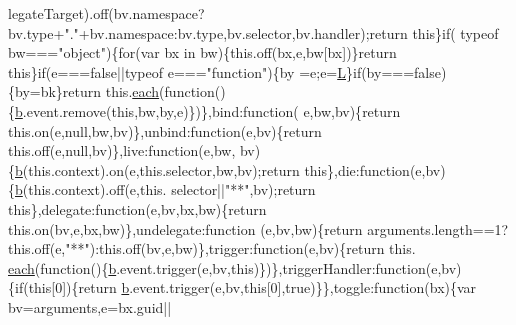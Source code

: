 \begin{DoxyCode}
      legateTarget).off(bv.namespace?bv.type+\textcolor{stringliteral}{"."}+bv.namespace:bv.type,bv.selector,bv.handler);return this\}\textcolor{keywordflow}{if}(
      typeof bw===\textcolor{stringliteral}{"object"})\{for(var bx in bw)\{this.off(bx,e,bw[bx])\}\textcolor{keywordflow}{return} \textcolor{keyword}{this}\}\textcolor{keywordflow}{if}(e===\textcolor{keyword}{false}||typeof e===\textcolor{stringliteral}{"function"})\{by
      =e;e=\hyperlink{docs_2_programmer's_manual_2html_2jquery_8js_a38ee4c0b5f4fe2a18d0c783af540d253}{L}\}\textcolor{keywordflow}{if}(by===\textcolor{keyword}{false})\{by=bk\}\textcolor{keywordflow}{return} this.\hyperlink{docs_2_programmer's_manual_2html_2jquery_8js_a871ff39db627c54c710a3e9909b8234c}{each}(\textcolor{keyword}{function}()\{\hyperlink{docs_2_programmer's_manual_2html_2jquery_8js_aa4026ad5544b958e54ce5e106fa1c805}{b}.event.remove(\textcolor{keyword}{this},bw,by,e)\})\},bind:\textcolor{keyword}{function}(
      e,bw,bv)\{\textcolor{keywordflow}{return} this.on(e,null,bw,bv)\},unbind:\textcolor{keyword}{function}(e,bv)\{\textcolor{keywordflow}{return} this.off(e,null,bv)\},live:\textcolor{keyword}{function}(e,bw,
      bv)\{\hyperlink{docs_2_programmer's_manual_2html_2jquery_8js_aa4026ad5544b958e54ce5e106fa1c805}{b}(this.context).on(e,this.selector,bw,bv);\textcolor{keywordflow}{return} \textcolor{keyword}{this}\},die:\textcolor{keyword}{function}(e,bv)\{\hyperlink{docs_2_programmer's_manual_2html_2jquery_8js_aa4026ad5544b958e54ce5e106fa1c805}{b}(this.context).off(e,this.
      selector||\textcolor{stringliteral}{"**"},bv);\textcolor{keywordflow}{return} \textcolor{keyword}{this}\},delegate:\textcolor{keyword}{function}(e,bv,bx,bw)\{\textcolor{keywordflow}{return} this.on(bv,e,bx,bw)\},undelegate:\textcolor{keyword}{function}
      (e,bv,bw)\{\textcolor{keywordflow}{return} arguments.length==1?this.off(e,\textcolor{stringliteral}{"**"}):this.off(bv,e,bw)\},trigger:function(e,bv)\{\textcolor{keywordflow}{return} this.
      \hyperlink{docs_2_programmer's_manual_2html_2jquery_8js_a871ff39db627c54c710a3e9909b8234c}{each}(\textcolor{keyword}{function}()\{\hyperlink{docs_2_programmer's_manual_2html_2jquery_8js_aa4026ad5544b958e54ce5e106fa1c805}{b}.event.trigger(e,bv,\textcolor{keyword}{this})\})\},triggerHandler:\textcolor{keyword}{function}(e,bv)\{\textcolor{keywordflow}{if}(\textcolor{keyword}{this}[0])\{\textcolor{keywordflow}{return} 
      \hyperlink{docs_2_programmer's_manual_2html_2jquery_8js_aa4026ad5544b958e54ce5e106fa1c805}{b}.event.trigger(e,bv,\textcolor{keyword}{this}[0],\textcolor{keyword}{true})\}\},toggle:\textcolor{keyword}{function}(bx)\{var bv=arguments,e=bx.guid||

\end{DoxyCode}
